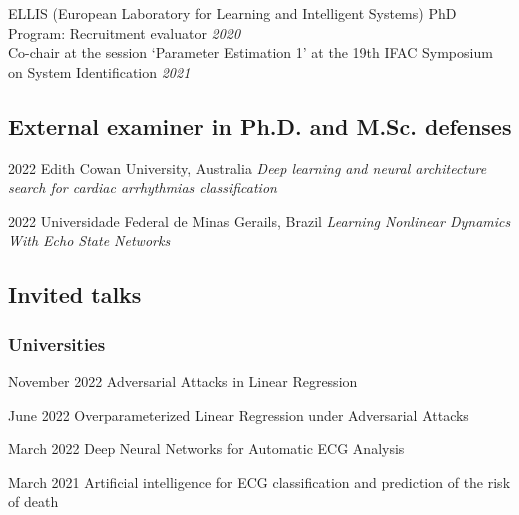 \documentclass[10pt,letterpaper]{article} %
\begin{document}
 ELLIS (European Laboratory for Learning and Intelligent Systems) PhD Program: Recruitment evaluator \hfill {\em 2020 } \\  Co-chair at the session `Parameter Estimation 1' at the 19th IFAC Symposium on System Identification \hfill {\em 2021 } \\ 

\subsection*{External examiner in Ph.D. and M.Sc. defenses}


    { 2022 }
    {  }
    { Edith Cowan University, Australia }
    { {\it Deep learning and neural architecture search for cardiac arrhythmias classification } }

    { 2022 }
    {  }
    { Universidade Federal de Minas Gerails, Brazil }
    { {\it Learning Nonlinear Dynamics With Echo State Networks } }



\subsection*{Invited talks}

\subsubsection*{Universities}

    
    { November 2022 }
    { Adversarial Attacks in Linear Regression  }
    { }{}
    

    
    { June 2022 }
    { Overparameterized Linear Regression under Adversarial Attacks  }
    { }{}
    

    
    { March 2022 }
    { Deep Neural Networks for Automatic ECG Analysis  }
    { }{}
    

    
    { March 2021 }
    { Artificial intelligence for ECG classification and prediction of the risk of death  }
    { }{}
    
\end{document}
